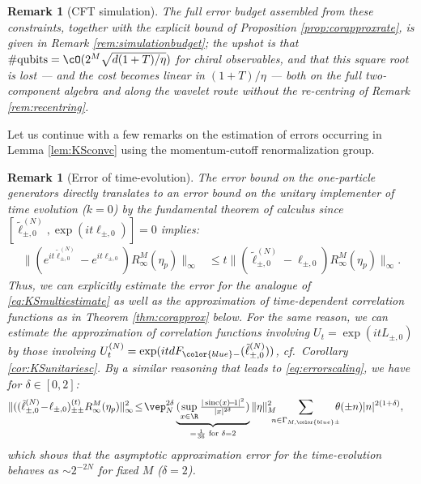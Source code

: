 \documentclass[a4paper, 11pt]{article}
\DeclareMathOperator{\1}{\mathds{1}}
\DeclareMathOperator{\sinc}{sinc}
\newtheorem{rem}[thm]{Remark}
\begin{document}
\begin{rem}[CFT simulation]
The full error budget assembled from these constraints, together with the explicit bound of Proposition \ref{prop:corapproxrate}, is given in Remark \ref{rem:simulationbudget}; the upshot is that $\#\textup{qubits}=\cO(2^{M}\sqrt{d(1+T)/\eta})$ for chiral observables, and that this square root is lost --- and the cost becomes linear in $(1+T)/\eta$ --- both on the full two-component algebra and along the wavelet route without the re-centring of Remark \ref{rem:recentring}.
\end{rem}

Let us continue with a few remarks on the estimation of errors occurring in Lemma \ref{lem:KSconvc} using the momentum-cutoff renormalization group.	
\begin{rem}[Error of time-evolution]
\label{rem:timeerror}
The error bound on the one-particle generators directly translates to an error bound on the unitary implementer of time evolution ($k=0$) by the fundamental theorem of calculus since $[\tilde{\ell}^{(N)}_{\pm,0},\exp(it\ell_{\pm,0})]=0$ implies:
\begin{align}
\label{eq:momrgestimatetime}
\|(e^{it\tilde{\ell}^{(N)}_{\pm,0}}-e^{it\ell_{\pm,0}})R^{M}_{\infty}(\eta_{p})\|_{\infty} & \leq t \|(\tilde{\ell}^{(N)}_{\pm,0}-\ell_{\pm,0})R^{M}_{\infty}(\eta_{p})\|_{\infty}.
\end{align}
Thus, we can explicitly estimate the error for the analogue of \eqref{eq:KSmultiestimate} as well as the approximation of time-dependent correlation functions as in Theorem \ref{thm:corapprox} below. For the same reason, we can estimate the approximation of correlation functions involving $U_{t}=\exp(itL_{\pm,0})$ by those involving $U^{(N)}_{t}=\exp(itdF_{{\color{blue}-}}(\tilde{\ell}^{(N)}_{\pm,0}))$, cf.~Corollary \ref{cor:KSunitariesc}. By a similar reasoning that leads to \eqref{eq:errorscaling}, we have for $\delta\in[0,2]$:
\begin{align}
\label{eq:momrgtimeerrorscaling}
\|((\tilde{\ell}^{(N)}_{\pm,0}\!-\!\ell_{\pm,0})^{(t)}_{\pm\pm}R^{M}_{\infty}(\eta_{p})\|_{\infty}^{2} & \!\leq\!\vep_{N}^{2\delta}\underbrace{(\sup_{x\in\R}\tfrac{|\sinc(x)\!-\!1|^{2}}{|x|^{2\delta}})}_{=\frac{1}{36}\textup{ for }\delta=2}\|\eta\|_{M}^{2}\!\!\!\!\sum_{n\in\Gamma_{M,{\color{blue}\pm}}}\!\!\!\!\theta(\pm n)|n|^{2(1+\delta)},
\end{align}
which shows that the asymptotic approximation error for the time-evolution behaves as $\sim 2^{-2N}$ for fixed $M$ ($\delta=2$).
\end{rem}
\end{document}
